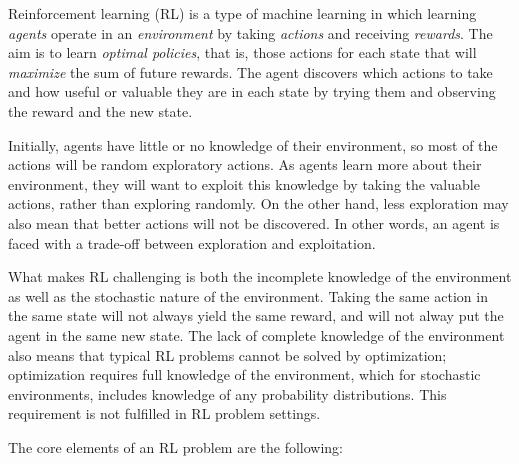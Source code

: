 Reinforcement learning (RL) is a type of machine learning in which learning \emph{agents} operate in an \emph{environment} by taking \emph{actions} and receiving \emph{rewards}. The aim is to learn \emph{optimal policies}, that is, those actions for each state that will \emph{maximize} the sum of future rewards. The agent discovers which actions to take and how useful or valuable they are in each state by trying them and observing the reward and the new state. 

Initially, agents have little or no knowledge of their environment, so most of the actions will be random exploratory actions. As agents learn more about their environment, they will want to exploit this knowledge by taking the valuable actions, rather than exploring randomly. On the other hand, less exploration may also mean that better actions will not be discovered. In other words, an agent is faced with a trade-off between exploration and exploitation.

What makes RL challenging is both the incomplete knowledge of the environment as well as the stochastic nature of the environment. Taking the same action in the same state will not always yield the same reward, and will not alway put the agent in the same new state. The lack of complete knowledge of the environment also means that typical RL problems cannot be solved by optimization; optimization requires full knowledge of the environment, which for stochastic environments, includes knowledge of any probability distributions. This requirement is not fulfilled in RL problem settings.

The core elements of an RL problem are the following:

